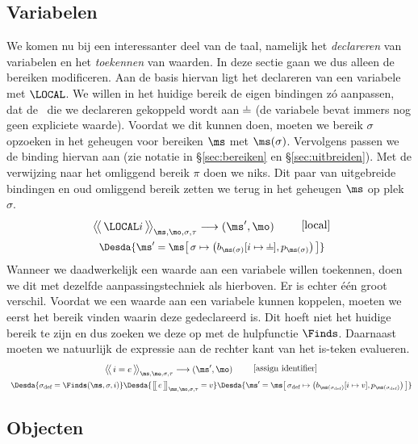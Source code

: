 \subsection{Variabelen}

We komen nu bij een interessanter deel van de taal, namelijk het \emph{declareren} van variabelen en het \emph{toekennen} van waarden. In deze sectie gaan we dus alleen de bereiken modificeren. Aan de basis hiervan ligt het declareren van een variabele met $\LOCAL$. We willen in het huidige bereik de eigen bindingen zó aanpassen, dat de \Id\ die we declareren gekoppeld wordt aan $\nil$ (de variabele bevat immers nog geen expliciete waarde). Voordat we dit kunnen doen, moeten we bereik $\sigma$ opzoeken in het geheugen voor bereiken $\ms$ met $\ms(\sigma)$. Vervolgens passen we de binding hiervan aan (zie notatie in §\ref{sec:bereiken} en §\ref{sec:uitbreiden}). Met de verwijzing naar het omliggend bereik $\pi$ doen we niks. Dit paar van uitgebreide bindingen en oud omliggend bereik zetten we terug in het geheugen $\ms$ op plek $\sigma$.
%
\begin{gather*}
  \AxiomC{$
    \Config{\LOCAL i}{\ms, \mo, \sigma, \tau}
    \longrightarrow
    (\ms', \mo)
  $}
  {\DisplayProof}
  \tag*{[local]} \\
  \Desdas{
    \Desda{\ms' = \ms \surr{ \sigma \mapsto \big(b_{\ms(\sigma)}[i \mapsto \BOT], p_{\ms(\sigma)}\big) }}
  }
\end{gather*}
%
Wanneer we daadwerkelijk een waarde aan een variabele willen toekennen, doen we dit met dezelfde aanpassingstechniek als hierboven. Er is echter één groot verschil. Voordat we een waarde aan een variabele kunnen koppelen, moeten we eerst het bereik vinden waarin deze gedeclareerd is. Dit hoeft niet het huidige bereik te zijn en dus zoeken we deze op met de hulpfunctie $\Finds$. Daarnaast moeten we natuurlijk de expressie aan de rechter kant van het is-teken evalueren.
%
\begin{gather*}
  \AxiomC{$
    \Config{i = e}{\ms, \mo, \sigma, \tau}
    \longrightarrow
    (\ms', \mo)
  $}
  {\DisplayProof}
  \tag*{[assign identifier]} \\
  \Desdas{
    \Desda{\sigma_\text{def} = \Finds(\ms, \sigma, i)}
    \Desda{\Surr{e}_{\ms, \mo, \sigma, \tau} = v}
    \Desda{\ms'= \ms \surr{ \sigma_\text{def} \mapsto \big(b_{\ms(\sigma_\text{def})}[ i \mapsto v ], p_{\ms(\sigma_\text{def})}\big) }}
  }
\end{gather*}

\subsection{Objecten}

